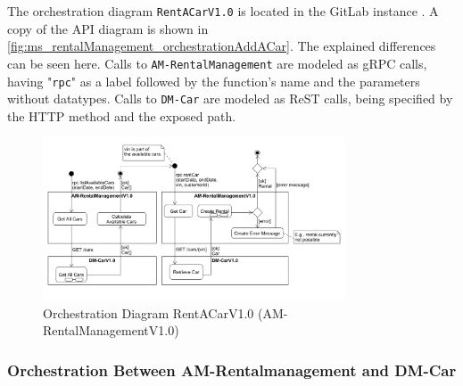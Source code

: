 The orchestration diagram \texttt{RentACarV1.0} is located in the GitLab instance \cite{CM-G-ORC}.
A copy of the API diagram is shown in \autoref{fig:ms_rentalManagement_orchestrationAddACar}.
The explained differences can be seen here.
Calls to \texttt{AM-RentalManagement} are modeled as gRPC calls, having "\texttt{rpc}" as a label followed by the function's name and the parameters without datatypes.
Calls to \texttt{DM-Car} are modeled as ReST calls, being specified by the HTTP method and the exposed path.

\begin{figure}
    \centering
    \includegraphics[width=0.8\textwidth]{figures/microservices/rentalManagement/ms_rentalManagement_orchestrationAddACar.png}
    \caption{Orchestration Diagram RentACarV1.0 (AM-RentalManagementV1.0)}
    \label{fig:ms_rentalManagement_orchestrationAddACar}
\end{figure}

\subsubsection*{Orchestration Between AM-Rentalmanagement and DM-Car}



